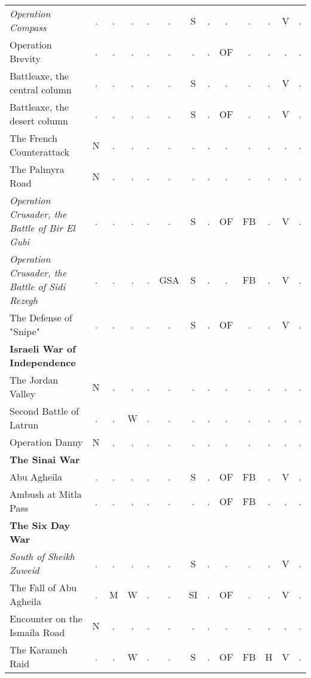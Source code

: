 \documentclass[a4paper]{article}
\newenvironment{texte}{\rmfamily\footnotesize}{}
\begin{document}
\begin{texte}
\begin{tabular}{lcccccccccccc}
\it  Operation Compass                             & . &  . &  . & .  &  .  & S  & . &  . &  . & . &  V & . \\
     Operation Brevity                             & . &  . &  . & .  &  .  & .  & . & OF &  . & . &  . & . \\
     Battleaxe, the central column                 & . &  . &  . & .  &  .  & S  & . &  . &  . & . &  V & . \\
     Battleaxe, the desert column                  & . &  . &  . & .  &  .  & S  & . & OF &  . & . &  V & . \\
     The French Counterattack                      & N &  . &  . & .  &  .  & .  & . &  . &  . & . &  . & . \\
     The Palmyra Road                              & N &  . &  . & .  &  .  & .  & . &  . &  . & . &  . & . \\
\it  Operation Crusader, the Battle of Bir El Gubi & . &  . &  . & .  &  .  & S  & . & OF & FB & . &  V & . \\
\it  Operation Crusader, the Battle of Sidi Rezegh & . &  . &  . & .  & GSA & S  & . &  . & FB & . &  V & . \\
     The Defense of "Snipe"                        & . &  . &  . & .  &  .  & S  & . & OF &  . & . &  V & . \\

\bf Israeli War of Independence \\

     The Jordan Valley                             & N &  . &  . &  . &  .  &  . & . &  . &  . & . &  . & . \\
     Second Battle of Latrun                       & . &  . &  W &  . &  .  &  . & . &  . &  . & . &  . & . \\
     Operation Danny                               & N &  . &  . &  . &  .  &  . & . &  . &  . & . &  . & . \\

\bf The Sinai War \\

     Abu Agheila                                   & . &  . &  . &  . &  .  & S  & . & OF & FB & . &  V & . \\
     Ambush at Mitla Pass                          & . &  . &  . &  . &  .  &  . & . & OF & FB & . &  . & . \\

\bf The Six Day War \\

\it  South of Sheikh Zuweid                        & . &  . &  . &  . &  .  & S  & . &  . &  . & . &  V & . \\
     The Fall of Abu Agheila                       & . &  M &  W &  . &  .  & SI & . & OF &  . & . &  V & . \\
     Encounter on the Ismaila Road                 & N &  . &  . &  . &  .  &  . & . &  . &  . & . &  . & . \\
     The Karameh Raid                              & . &  . &  W &  . &  .  & S  & . & OF & FB & H &  V & . \\


\end{tabular}
\end{texte}
\end{document}

